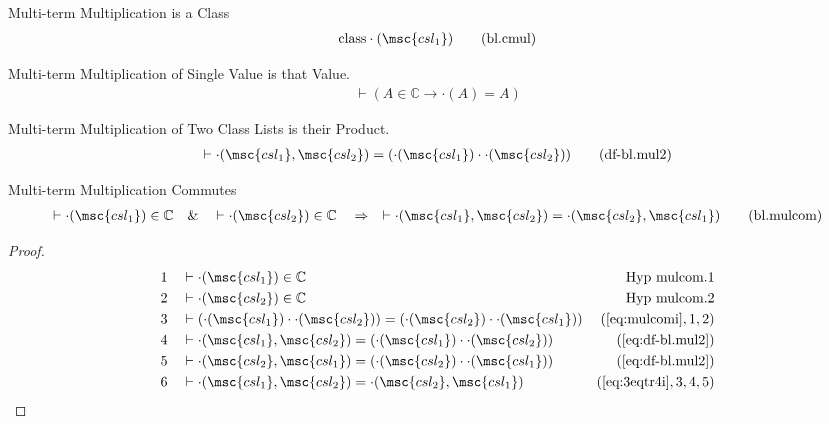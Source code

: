 \begin{metadefinition} {Multi-term Multiplication is a Class}
\begin{align}
{\rm class} \cdot( \msc{csl_1} )\label{eq:bl.cmul}\tag{bl.cmul}
\end{align}
\end{metadefinition}


\begin{metadefinition} {Multi-term Multiplication of Single
Value is that Value.}
\begin{align}
\vdash ( A \in \mathbb{C} \rightarrow \cdot( A ) = A
    )\label{eq:df-bl.mul1}\tag{df-bl.mul1}
\end{align}
\end{metadefinition}


\begin{metadefinition} {Multi-term Multiplication of Two
Class Lists is their Product.}
\begin{align}
\vdash \cdot( \msc{csl_1} , \msc{csl_2} ) = ( \cdot( \msc{csl_1} ) \cdot \cdot(
    \msc{csl_2} ) )\label{eq:df-bl.mul2}\tag{df-bl.mul2}
\end{align}
\end{metadefinition}


\begin{lemma} {Multi-term Multiplication Commutes}
\begin{align}
\vdash \cdot( \msc{csl_1} ) \in \mathbb{C}\quad\&\quad \vdash \cdot(
    \msc{csl_2} ) \in \mathbb{C}\quad\Rightarrow\quad \vdash \cdot( \msc{csl_1}
    , \msc{csl_2} ) = \cdot( \msc{csl_2} , \msc{csl_1}
    )\label{eq:bl.mulcom}\tag{bl.mulcom}
\end{align}
\end{lemma}


\begin{proof}
\begin{align}
  1 &&  & \vdash \cdot( \msc{csl_1} ) \in
     \mathbb{C}&\text{Hyp~mulcom.1}\notag%
  \\ 2 &&  & \vdash \cdot( \msc{csl_2} ) \in
     \mathbb{C}&\text{Hyp~mulcom.2}\notag%
  \\ 3 &&  & \vdash ( \cdot( \msc{csl_1} ) \cdot \cdot( \msc{csl_2} ) ) = (
     \cdot( \msc{csl_2} ) \cdot \cdot( \msc{csl_1} )
     )&(\mbox{\ref{eq:mulcomi}},1,2)\notag
  \\ 4 &&  & \vdash \cdot( \msc{csl_1} , \msc{csl_2} ) = ( \cdot( \msc{csl_1} )
     \cdot \cdot( \msc{csl_2} )
     )&(\mbox{\ref{eq:df-bl.mul2}})\notag
  \\ 5 &&  & \vdash \cdot( \msc{csl_2} , \msc{csl_1} ) = ( \cdot( \msc{csl_2} )
     \cdot \cdot( \msc{csl_1} )
     )&(\mbox{\ref{eq:df-bl.mul2}})\notag
  \\ 6 &&  & \vdash \cdot( \msc{csl_1} , \msc{csl_2} ) = \cdot( \msc{csl_2} ,
     \msc{csl_1} )&(\mbox{\ref{eq:3eqtr4i}},3,4,5)\notag
\end{align}
\end{proof}

